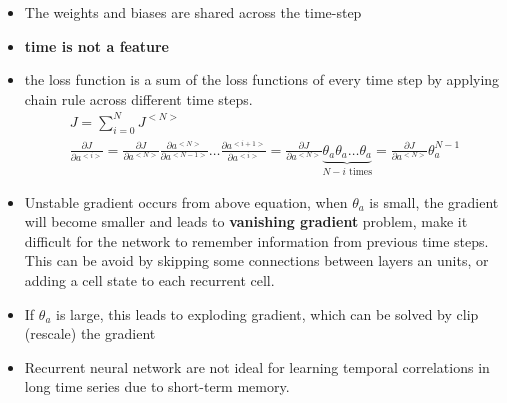 \documentclass[a4paper,10pt]{article}
\begin{document}
\begin{itemize}
    \item The weights and biases are shared across the time-step
    \item \textbf{time is not a feature}
    \item the loss function is a sum of the loss functions of every time step by applying chain rule across different time steps. 
        \begin{gather*}
            J = \sum_{i=0}^{N}J^{<N>}\\
            \frac{\partial J}{\partial a^{<i>}} = \frac{\partial J}{\partial a^{<N>}}\frac{\partial a^{<N>}}{\partial a^{<N-1>}}\dots\frac{\partial a^{<i+1>}}{\partial a^{<i>}} = \frac{\partial J}{\partial a^{<N>}}\underbrace{\theta_a\theta_a\dots\theta_a}_{N-i\text{ times}} = \frac{\partial J}{\partial a^{<N>}}\theta_a^{N-1}
        \end{gather*}
    \item Unstable gradient occurs from above equation, when $\theta_a$ is small, the gradient will become smaller and leads to \textbf{vanishing gradient} problem,  make it difficult for the network to remember information from previous time steps. This can be avoid by skipping some connections between layers an units, or adding a cell state to each recurrent cell. 
    \item If $\theta_a$ is large, this leads to exploding gradient, which can be solved by clip (rescale) the gradient
    \item Recurrent neural network are not ideal for learning temporal correlations in long time series due to short-term memory. 
\end{itemize}
\end{document}
